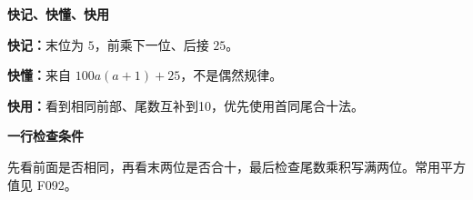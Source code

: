 \clearpage
\begin{summarybox}
\textbf{\textcolor{CSummary}{快记、快懂、快用}}
\par\medskip
\begin{center}

\end{center}
\medskip
\textbf{快记：}末位为 $5$，前乘下一位、后接 $25$。\par\textbf{快懂：}来自 $100a(a+1)+25$，不是偶然规律。\par\textbf{快用：}看到相同前部、尾数互补到10，优先使用首同尾合十法。
\end{summarybox}
\clearpage
\begin{summarybox}
\textbf{\textcolor{CSummary}{一行检查条件}}
\par\medskip
\begin{center}

\end{center}
\medskip
先看前面是否相同，再看末两位是否合十，最后检查尾数乘积写满两位。常用平方值见 F092。
\end{summarybox}
